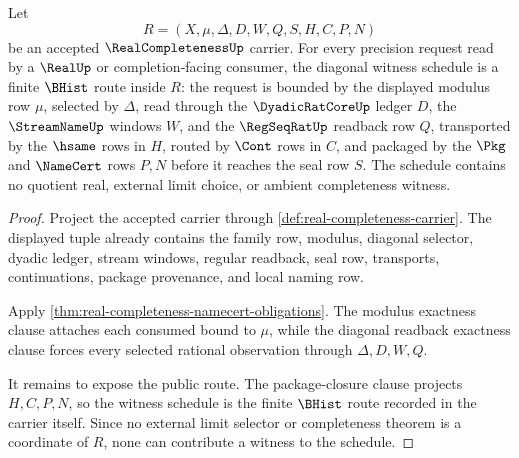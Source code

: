 \begin{theorem}
\label{thm:real-completeness-diagonal-witness-schedule}
Let
$$
R=(X,\mu,\Delta,D,W,Q,S,H,C,P,N)
$$
be an accepted $\RealCompletenessUp$ carrier. For every precision request read by a $\RealUp$ or completion-facing consumer, the diagonal witness schedule is a finite $\BHist$ route inside $R$: the request is bounded by the displayed modulus row $\mu$, selected by $\Delta$, read through the $\DyadicRatCoreUp$ ledger $D$, the $\StreamNameUp$ windows $W$, and the $\RegSeqRatUp$ readback row $Q$, transported by the $\hsame$ rows in $H$, routed by $\Cont$ rows in $C$, and packaged by the $\Pkg$ and $\NameCert$ rows $P,N$ before it reaches the seal row $S$. The schedule contains no quotient real, external limit choice, or ambient completeness witness.
\end{theorem}
\begin{proof}
Project the accepted carrier through \autoref{def:real-completeness-carrier}. The displayed tuple already contains the family row, modulus, diagonal selector, dyadic ledger, stream windows, regular readback, seal row, transports, continuations, package provenance, and local naming row.

Apply \autoref{thm:real-completeness-namecert-obligations}. The modulus exactness clause attaches each consumed bound to $\mu$, while the diagonal readback exactness clause forces every selected rational observation through $\Delta,D,W,Q$.

It remains to expose the public route. The package-closure clause projects $H,C,P,N$, so the witness schedule is the finite $\BHist$ route recorded in the carrier itself. Since no external limit selector or completeness theorem is a coordinate of $R$, none can contribute a witness to the schedule.
\end{proof}

